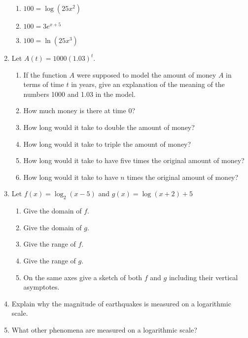 \documentclass[12pt]{article}
\theoremstyle{plain}     %
\begin{document}
\begin{enumerate}
\begin{multicols}{2}
\begin{enumerate}
			\item $100 = \log (25x^2)$
			\item $100 = 3e^{x+5}$
			\item $100 = \ln (25x^3)$
		\end{enumerate}			
	\end{multicols}
	\item Let $A(t)=1000(1.03)^t$.
		\begin{enumerate}
			\item If the function $A$ were supposed to model the amount of money $A$ in terms of time $t$ in years, give an explanation of the meaning of the numbers 1000 and 1.03 in the model.
			\item How much money is there at time 0?
			\item How long would it take to double the amount of money?
			\item How long would it take to triple the amount of money?
			\item How long would it take to have five times the original amount of money?
			\item How long would it take to have $n$ times the original amount of money?
		\end{enumerate}
\newpage

	\item Let $f(x)= \log_2 (x-5)$ and $g(x)=\log (x+2)+5$
		\begin{enumerate}
			\item Give the domain of $f$.
			\item Give the domain of $g$.
			\item Give the range of $f$.
			\item Give the range of $g$.
			\item On the same axes give a sketch of both $f$ and $g$ including their vertical asymptotes.
		\end{enumerate}
	\item Explain why the magnitude of earthquakes is measured on a logarithmic scale.
	\item What other phenomena are measured on a logarithmic scale?
\end{enumerate}
	
\end{document}
